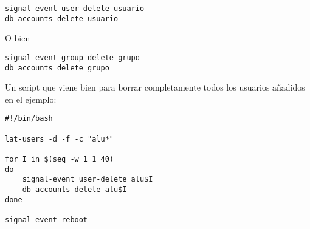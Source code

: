 \begin{lstlisting}
signal-event user-delete usuario
db accounts delete usuario
\end{lstlisting}

O bien

\begin{lstlisting}
signal-event group-delete grupo
db accounts delete grupo
\end{lstlisting}

Un script que viene bien para borrar completamente todos los usuarios añadidos en el ejemplo:

\begin{lstlisting}
#!/bin/bash

lat-users -d -f -c "alu*"

for I in $(seq -w 1 1 40)
do
    signal-event user-delete alu$I
    db accounts delete alu$I
done

signal-event reboot
\end{lstlisting}
